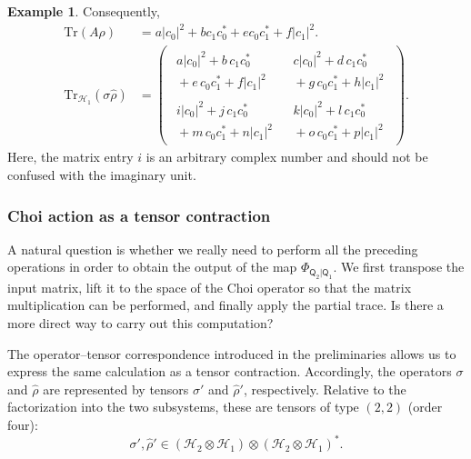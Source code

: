 \documentclass[
    aps,
    pra,
    reprint,
    superscriptaddress,
    nofootinbib
]{revtex4-2}
\theoremstyle{definition}
\newtheorem{example}{Example}[section]
\theoremstyle{plain}
\begin{document}
\begin{example}
    Consequently,
    \begin{align}
        \mathrm{Tr}(A\rho)
        &=
        a|c_{0}|^{2}
        +bc_{1}c_{0}^{*}
        +ec_{0}c_{1}^{*}
        +f|c_{1}|^{2}.
        \\
        \mathrm{Tr}_{\mathcal{H}_{1}}(\sigma\hat{\rho})
        &=
        \begin{pmatrix}
        \begin{gathered}
        a|c_0|^2+b\,c_1c_0^*\\
        {}+e\,c_0c_1^*+f|c_1|^2
        \end{gathered}
        &
        \begin{gathered}
        c|c_0|^2+d\,c_1c_0^*\\
        {}+g\,c_0c_1^*+h|c_1|^2
        \end{gathered}
        \\[2.5ex]
        \begin{gathered}
        i|c_0|^2+j\,c_1c_0^*\\
        {}+m\,c_0c_1^*+n|c_1|^2
        \end{gathered}
        &
        \begin{gathered}
        k|c_0|^2+l\,c_1c_0^*\\
        {}+o\,c_0c_1^*+p|c_1|^2
        \end{gathered}
        \end{pmatrix}.
        \label{eq:pt2}
    \end{align}
    Here, the matrix entry $i$ is an arbitrary complex number and
    should not be confused with the imaginary unit.
\end{example}

\subsubsection{Choi action as a tensor contraction}
\label{subsubsec:Mat-Gt}

A natural question is whether we really need to perform all the
preceding operations in order to obtain the output of the map
$\Phi_{\mathsf{Q}_{2}|\mathsf{Q}_{1}}$. We first transpose the input
matrix, lift it to the space of the Choi operator so that the matrix
multiplication can be performed, and finally apply the partial trace. Is
there a more direct way to carry out this computation?

The operator--tensor correspondence introduced in the preliminaries
allows us to express the same calculation as a tensor contraction.
Accordingly, the operators $\sigma$ and $\hat{\rho}$ are represented by
tensors $\sigma'$ and $\hat{\rho}'$, respectively. Relative to the
factorization into the two subsystems, these are tensors of type $(2,2)$
(order four):
\begin{equation}
    \sigma',\hat{\rho}'
    \in
    (\mathcal{H}_{2}\otimes\mathcal{H}_{1})
    \otimes
    (\mathcal{H}_{2}\otimes\mathcal{H}_{1})^{*}.
\end{equation}
\end{document}
